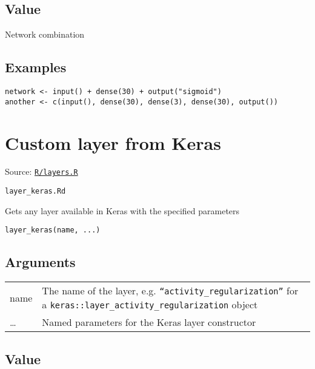 \hypertarget{value}{\subsection{\texorpdfstring{\protect\hyperlink{value}{}Value}{Value}}\label{value}}

Network combination

\hypertarget{examples}{\subsection{\texorpdfstring{\protect\hyperlink{examples}{}Examples}{Examples}}\label{examples}}

\begin{verbatim}
network <- input() + dense(30) + output("sigmoid")
another <- c(input(), dense(30), dense(3), dense(30), output())
\end{verbatim}

\section{Custom layer from Keras}\label{custom-layer-from-keras}

Source:
\href{https://github.com/fdavidcl/ruta/blob/master/R/layers.R}{\texttt{R/layers.R}}

\texttt{layer\_keras.Rd}

Gets any layer available in Keras with the specified parameters

\begin{verbatim}
layer_keras(name, ...)
\end{verbatim}

\hypertarget{arguments}{\subsection{\texorpdfstring{\protect\hyperlink{arguments}{}Arguments}{Arguments}}\label{arguments}}

\begin{longtable}[c]{@{}>{\small}p{3cm}>{\raggedright}p{12.5cm}@{}}
\toprule
name & The name of the layer, e.g. \texttt{``activity\_regularization''}
for a \texttt{keras::layer\_activity\_regularization}
object\tabularnewline
\ldots{} & Named parameters for the Keras layer
constructor\tabularnewline
\bottomrule
\end{longtable}

\hypertarget{value}{\subsection{\texorpdfstring{\protect\hyperlink{value}{}Value}{Value}}\label{value}}

